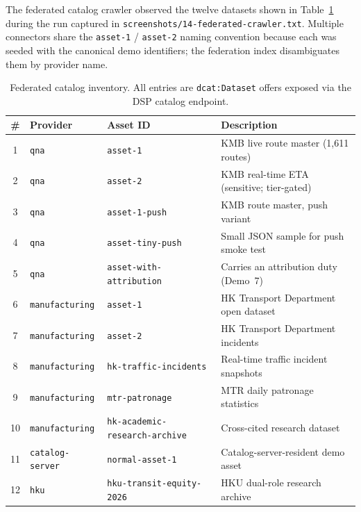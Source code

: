 \documentclass[11pt,a4paper]{article}
\DeclareRobustCommand{\code}[1]{\texttt{\small #1}}
\begin{document}
The federated catalog crawler observed the twelve datasets shown in
Table~\ref{tab:assets} during the run captured in
\code{screenshots/14-federated-crawler.txt}. Multiple connectors share the
\code{asset-1} / \code{asset-2} naming convention because each was seeded
with the canonical demo identifiers; the federation index disambiguates
them by provider name.

\begin{table}[ht]
\small
\caption{Federated catalog inventory. All entries are
\code{dcat:Dataset} offers exposed via the DSP catalog endpoint.}
\label{tab:assets}
\begin{tabularx}{\linewidth}{@{}c l l X@{}}
\toprule
\textbf{\#} & \textbf{Provider} & \textbf{Asset ID} & \textbf{Description} \\
\midrule
1  & \code{qna}            & \code{asset-1}                    & KMB live route master (1{,}611 routes) \\
2  & \code{qna}            & \code{asset-2}                    & KMB real-time ETA (sensitive; tier-gated) \\
3  & \code{qna}            & \code{asset-1-push}               & KMB route master, push variant \\
4  & \code{qna}            & \code{asset-tiny-push}            & Small JSON sample for push smoke test \\
5  & \code{qna}            & \code{asset-with-attribution}     & Carries an attribution duty (Demo~7) \\
6  & \code{manufacturing}  & \code{asset-1}                    & HK Transport Department open dataset \\
7  & \code{manufacturing}  & \code{asset-2}                    & HK Transport Department incidents \\
8  & \code{manufacturing}  & \code{hk-traffic-incidents}       & Real-time traffic incident snapshots \\
9  & \code{manufacturing}  & \code{mtr-patronage}              & MTR daily patronage statistics \\
10 & \code{manufacturing}  & \code{hk-academic-research-archive} & Cross-cited research dataset \\
11 & \code{catalog-server} & \code{normal-asset-1}             & Catalog-server-resident demo asset \\
12 & \code{hku}            & \code{hku-transit-equity-2026}    & HKU dual-role research archive \\
\bottomrule
\end{tabularx}
\end{table}
\end{document}
